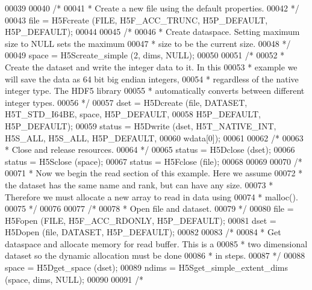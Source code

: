 \begin{DoxyCode}
00039 
00040     \textcolor{comment}{/*}
00041 \textcolor{comment}{     * Create a new file using the default properties.}
00042 \textcolor{comment}{     */}
00043     file = H5Fcreate (FILE, H5F\_ACC\_TRUNC, H5P\_DEFAULT, H5P\_DEFAULT);
00044 
00045     \textcolor{comment}{/*}
00046 \textcolor{comment}{     * Create dataspace.  Setting maximum size to NULL sets the maximum}
00047 \textcolor{comment}{     * size to be the current size.}
00048 \textcolor{comment}{     */}
00049     space = H5Screate\_simple (2, dims, NULL);
00050 
00051     \textcolor{comment}{/*}
00052 \textcolor{comment}{     * Create the dataset and write the integer data to it.  In this}
00053 \textcolor{comment}{     * example we will save the data as 64 bit big endian integers,}
00054 \textcolor{comment}{     * regardless of the native integer type.  The HDF5 library}
00055 \textcolor{comment}{     * automatically converts between different integer types.}
00056 \textcolor{comment}{     */}
00057     dset = H5Dcreate (file, DATASET, H5T\_STD\_I64BE, space, H5P\_DEFAULT,
00058                 H5P\_DEFAULT, H5P\_DEFAULT);
00059     status = H5Dwrite (dset, H5T\_NATIVE\_INT, H5S\_ALL, H5S\_ALL, H5P\_DEFAULT,
00060                 wdata[0]);
00061 
00062     \textcolor{comment}{/*}
00063 \textcolor{comment}{     * Close and release resources.}
00064 \textcolor{comment}{     */}
00065     status = H5Dclose (dset);
00066     status = H5Sclose (space);
00067     status = H5Fclose (file);
00068 
00069 
00070     \textcolor{comment}{/*}
00071 \textcolor{comment}{     * Now we begin the read section of this example.  Here we assume}
00072 \textcolor{comment}{     * the dataset has the same name and rank, but can have any size.}
00073 \textcolor{comment}{     * Therefore we must allocate a new array to read in data using}
00074 \textcolor{comment}{     * malloc().}
00075 \textcolor{comment}{     */}
00076 
00077     \textcolor{comment}{/*}
00078 \textcolor{comment}{     * Open file and dataset.}
00079 \textcolor{comment}{     */}
00080     file = H5Fopen (FILE, H5F\_ACC\_RDONLY, H5P\_DEFAULT);
00081     dset = H5Dopen (file, DATASET, H5P\_DEFAULT);
00082 
00083     \textcolor{comment}{/*}
00084 \textcolor{comment}{     * Get dataspace and allocate memory for read buffer.  This is a}
00085 \textcolor{comment}{     * two dimensional dataset so the dynamic allocation must be done}
00086 \textcolor{comment}{     * in steps.}
00087 \textcolor{comment}{     */}
00088     space = H5Dget\_space (dset);
00089     ndims = H5Sget\_simple\_extent\_dims (space, dims, NULL);
00090 
00091     \textcolor{comment}{/*}

\end{DoxyCode}
